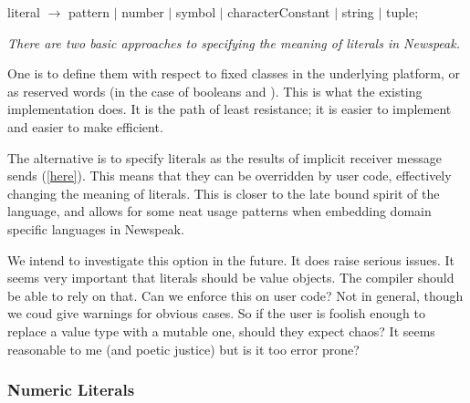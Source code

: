 \documentclass{article}
\begin{document}
\begin{newspeak}
literal $\rightarrow$  pattern $|$ number $|$ symbol $|$ characterConstant $|$ string $|$ tuple;
\end{newspeak}

{\it
There are two basic approaches to specifying the meaning of literals in Newspeak. 

One is to define them with respect to fixed classes in the underlying platform, or as reserved words (in the case of booleans and \NIL{}). This is what the existing implementation does. It is the path of least resistance; it is easier to implement and easier to make efficient.

The alternative is to specify literals as the results of implicit receiver message  sends (\ref{here}). This means that they can be overridden by user code, effectively changing the meaning of literals. This is closer to the late bound spirit of the language, and allows for some neat usage patterns when embedding domain specific languages in Newspeak.

We intend to investigate this option in the future. It does raise serious issues. It seems very important that literals should be value objects.  The compiler should be able to rely on that. Can we enforce this on user code? Not in general, though we coud give warnings for obvious cases. So if the user is foolish enough to replace a value type with a mutable one, should they expect chaos? It seems reasonable to me (and poetic justice) but is it too error prone?
}

\subsubsection{ Numeric Literals}
\label{number}
\end{document}
